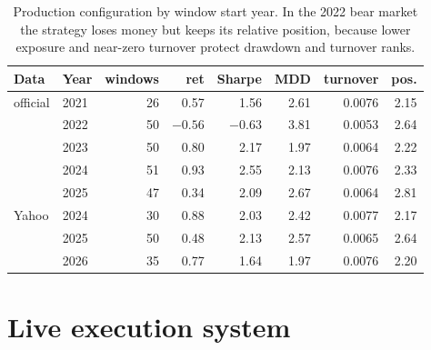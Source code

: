 \documentclass[11pt,a4paper]{article}
\begin{document}
\begin{table}[h]
\centering\small
\begin{tabular}{llrrrrrr}
\toprule
Data & Year & windows & ret & Sharpe & MDD & turnover & pos. \\
\midrule
official & 2021 & 26 & 0.57 & 1.56 & 2.61 & 0.0076 & 2.15 \\
 & 2022 & 50 & $-0.56$ & $-0.63$ & 3.81 & 0.0053 & 2.64 \\
 & 2023 & 50 & 0.80 & 2.17 & 1.97 & 0.0064 & 2.22 \\
 & 2024 & 51 & 0.93 & 2.55 & 2.13 & 0.0076 & 2.33 \\
 & 2025 & 47 & 0.34 & 2.09 & 2.67 & 0.0064 & 2.81 \\
Yahoo & 2024 & 30 & 0.88 & 2.03 & 2.42 & 0.0077 & 2.17 \\
 & 2025 & 50 & 0.48 & 2.13 & 2.57 & 0.0065 & 2.64 \\
 & 2026 & 35 & 0.77 & 1.64 & 1.97 & 0.0076 & 2.20 \\
\bottomrule
\end{tabular}
\caption{Production configuration by window start year. In the 2022 bear market the strategy loses money but keeps its
relative position, because lower exposure and near-zero turnover protect drawdown and turnover ranks.}
\label{tab:years}
\end{table}

\section{Live execution system}\label{sec:live}
\end{document}
